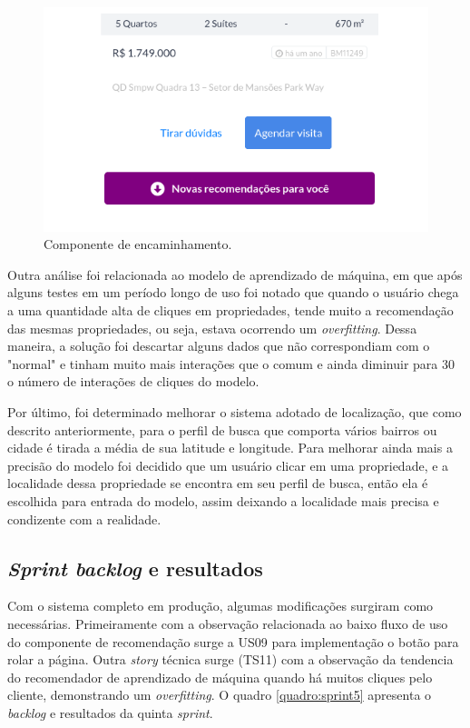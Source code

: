 \begin{figure}[H]
    \centering
    \includegraphics[scale=0.6]{figuras/desenvolvimento/componente_scroll.png}
    \caption[Componente de encaminhamento]{Componente de encaminhamento.}
    \label{fig:componente_scroll}
\end{figure}

Outra análise foi relacionada ao modelo de aprendizado de máquina, em que após alguns testes em um período longo de uso foi notado que quando o usuário chega a uma quantidade alta de cliques em propriedades, tende muito a recomendação das mesmas propriedades, ou seja, estava ocorrendo um \textit{overfitting}. Dessa maneira, a solução foi descartar alguns dados que não correspondiam com o "normal" e tinham muito mais interações  que o comum e ainda diminuir para 30 o número de interações de cliques do modelo.

Por último, foi determinado melhorar o sistema adotado de localização, que como descrito anteriormente, para o perfil de busca que comporta vários bairros ou cidade é tirada a média de sua latitude e longitude. Para melhorar ainda mais a precisão do modelo foi decidido que um usuário clicar em uma propriedade, e a localidade dessa propriedade se encontra em seu perfil de busca, então ela é escolhida para entrada do modelo, assim deixando a localidade mais precisa e condizente com a realidade.

\subsection{\textit{Sprint backlog} e resultados}

Com o sistema completo em produção, algumas modificações surgiram como necessárias. Primeiramente com a observação relacionada ao baixo fluxo de uso do componente de recomendação surge a US09 para implementação o botão para rolar a página. Outra \textit{story} técnica surge (TS11) com a observação da tendencia do recomendador de aprendizado de máquina quando há muitos cliques pelo cliente, demonstrando um  \textit{overfitting}. O quadro \ref{quadro:sprint5} apresenta o \textit{backlog} e resultados da quinta  \textit{sprint}.

